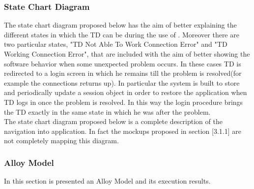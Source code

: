\subsubsection{State Chart Diagram}
\begin{itemize}
	 The state chart diagram proposed below has the aim of better explaining the different states in which the TD can be during the use of \myTaxiService{}. 
		Moreover there are two particular states, "TD Not Able To Work Connection Error" and "TD Working Connection Error", that are included with the aim of better showing the software behavior when some unexpected problem occurs. 
		In these cases TD is redirected to a login screen in which he remains till the problem is resolved(for example the connections returns up). 
		In particular the system is built to store and periodically update a session object in order to restore the application when TD logs in once the problem is resolved.  
		In this way the login procedure  brings the TD exactly in the same state in which he was after the problem.\\
%
	\newpage
%
	 The state chart diagram proposed below is a complete description of the navigation into \myTaxiService{} application.
		In fact the mockups proposed in section [3.1.1] are not completely mapping this diagram.\\
\end{itemize}
%
\newpage
\subsubsection{Alloy Model}
In this section is presented an Alloy Model and its execution results.
%
\newpage
{}
\begin{itemize}
	\\
		\newpage
	\\
		\newpage
	\\
		\newpage
	\\
		\newpage
\end{itemize}
%
